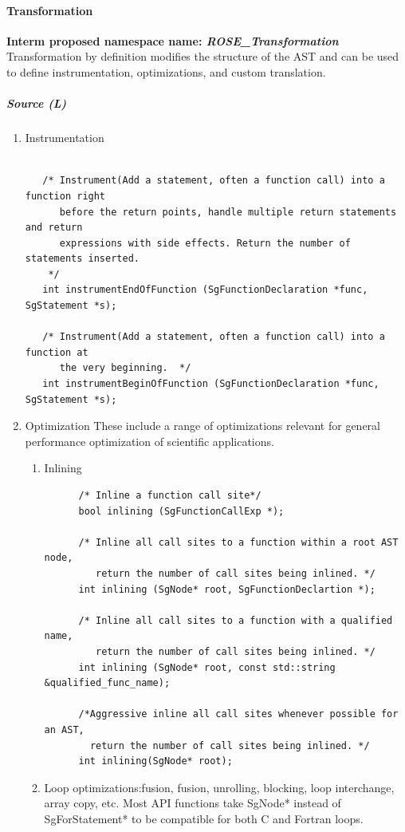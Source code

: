 \paragraph{Transformation}
{\bf Interm proposed namespace name: {\em ROSE\_Transformation}} \\
   Transformation by definition modifies the structure of the AST and can be used
to define instrumentation, optimizations, and custom translation.
\subparagraph{Source (L)}
\begin{enumerate}
   \item Instrumentation 
   \begin{lstlisting}

   /* Instrument(Add a statement, often a function call) into a function right
      before the return points, handle multiple return statements and return
      expressions with side effects. Return the number of statements inserted.
    */
   int instrumentEndOfFunction (SgFunctionDeclaration *func, SgStatement *s);

   /* Instrument(Add a statement, often a function call) into a function at
      the very beginning.  */
   int instrumentBeginOfFunction (SgFunctionDeclaration *func, SgStatement *s);
   \end{lstlisting}
   \item Optimization
         These include a range of optimizations relevant for general performance
         optimization of scientific applications.
   \begin{enumerate}
      \item Inlining
      \begin{lstlisting}
      /* Inline a function call site*/
      bool inlining (SgFunctionCallExp *);

      /* Inline all call sites to a function within a root AST node,
         return the number of call sites being inlined. */
      int inlining (SgNode* root, SgFunctionDeclartion *);

      /* Inline all call sites to a function with a qualified name,
         return the number of call sites being inlined. */
      int inlining (SgNode* root, const std::string &qualified_func_name);

      /*Aggressive inline all call sites whenever possible for an AST,
        return the number of call sites being inlined. */
      int inlining(SgNode* root);

      \end{lstlisting}
      \item Loop optimizations:fusion, fusion, unrolling, blocking, loop
                  interchange, array copy, etc.
Most API functions take SgNode* instead of SgForStatement* to be compatible for both C and Fortran loops.
       \begin{lstlisting}


\end{lstlisting}
\end{enumerate}
\end{enumerate}
